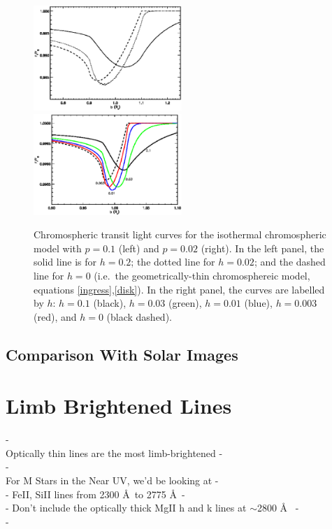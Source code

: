 \documentclass[manuscript]{aastex}
\begin{document}
\begin{figure}

\includegraphics[width=0.5\textwidth]{lc_h.1_p.1.eps}
\includegraphics[width=0.5\textwidth]{plot_3d_p.02.eps}
\caption{Chromospheric transit light curves for the
isothermal chromospheric model with $p=0.1$ (left) and
$p=0.02$ (right).   In the left panel, the
solid line is for $h=0.2$; the dotted line for $h=0.02$;
and the dashed line for $h=0$ (i.e.\ the geometrically-thin
chromosphereic model, equations \ref{ingress},\ref{disk}).
In the right panel, the curves are labelled by $h$:
$h=0.1$ (black), $h=0.03$ (green), $h=0.01$ (blue),
$h=0.003$ (red), and $h=0$ (black dashed).}
\label{fig04}
\end{figure}

\subsection{Comparison With Solar Images}

\section{Limb Brightened Lines}

-\\
Optically thin lines are the most limb-brightened
-\\
-\\
For M Stars in the Near UV, we'd be looking at 
-\\
- FeII, SiII lines from 2300 \AA\  to 2775 \AA\ 
-\\
- Don't include the optically thick MgII h and k lines at
$\sim$2800 \AA\ \citep{2007PASP..119...67H}
-\\
-\\
\end{document}
